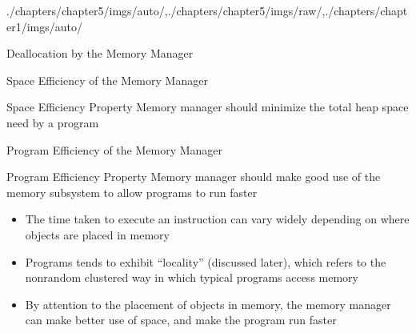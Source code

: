 \begin{graphicspathcontext}{{./chapters/chapter5/imgs/auto/},{./chapters/chapter5/imgs/raw/},{./chapters/chapter1/imgs/auto/}}
\begin{bibunit}[apalike]
\begin{frame}{Deallocation by the Memory Manager}
	\begin{rightarrowsequence}
	\end{rightarrowsequence}
\end{frame}

\begin{frame}{{Space Efficiency} of the Memory Manager}
	\begin{definitionblock}{Space Efficiency Property}
		Memory manager should minimize the total heap space need by a program
	\end{definitionblock}
	\vspace{1cm}
\end{frame}

\begin{frame}{{Program Efficiency} of the Memory Manager}
	\begin{definitionblock}{Program Efficiency Property}
		Memory manager should make good use of the memory subsystem to allow programs to run faster
	\end{definitionblock}
	\vspace{1cm}
	\begin{itemize}
		\item The time taken to execute an instruction can vary widely depending on where objects are placed in memory
		\item Programs tends to exhibit ``locality'' (discussed later), which refers to the nonrandom clustered way in which typical programs access memory
		\item By attention to the placement of objects in memory, the memory manager can make better use of space, and make the program run faster
	\end{itemize}
\end{frame}


\end{bibunit}
\end{graphicspathcontext}

